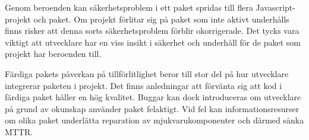 Genom beroenden kan säkerhetsproblem i ett paket spridas till flera Javascript-projekt och paket. Om projekt förlitar sig på paket som inte aktivt underhålls finns risker att denna sorts säkerhetsproblem förblir okorrigerade. Det tycks vara viktigt att utvecklare har en viss insikt i säkerhet och underhåll för de paket som projekt har beroenden till.

Färdiga pakets påverkan på tillförlitlighet beror till stor del på hur utvecklare integrerar paketen i projekt. Det finns anledningar att förvänta sig att kod i färdiga paket håller en hög kvalitet. Buggar kan dock introduceras om utvecklare på grund av okunskap använder paket felaktigt. Vid fel kan informationsresurser om olika paket underlätta reparation av mjukvarukomponenter och därmed sänka MTTR.
